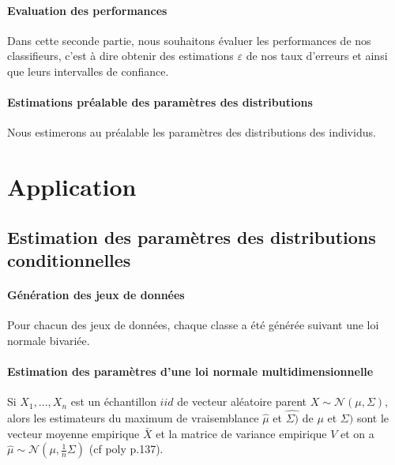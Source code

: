 \documentclass{report}
\begin{document}
\paragraph{Evaluation des performances}
Dans cette seconde partie, nous souhaitons évaluer les performances de nos classifieurs, c'est à dire obtenir des estimations $\varepsilon $ de nos taux d'erreurs et ainsi que leurs intervalles de confiance.
\paragraph{Estimations préalable des paramètres des distributions}
Nous estimerons au préalable les paramètres des distributions des individus.

\section{Application}
\subsection{Estimation des paramètres des distributions conditionnelles}
\paragraph{Génération des jeux de données}
Pour chacun des jeux de données, chaque classe a été générée suivant une loi normale bivariée.
\paragraph{Estimation des paramètres d'une loi normale multidimensionnelle}
Si $X_1,...,X_n$ est un échantillon $iid$ de vecteur aléatoire parent $X \sim \mathcal{N}(\mu, \Sigma)$, alors les estimateurs du maximum de vraisemblance $\hat{\mu}$ et $\hat{\Sigma)}$ de $\mu$ et $\Sigma)$ sont le vecteur moyenne empirique $\bar{X}$ et la matrice de variance empirique $V$ et on a $\hat{\mu} \sim \mathcal{N} (\mu, \frac{1}{n}\Sigma)$ (cf poly p.137).

\newpage
\end{document}
